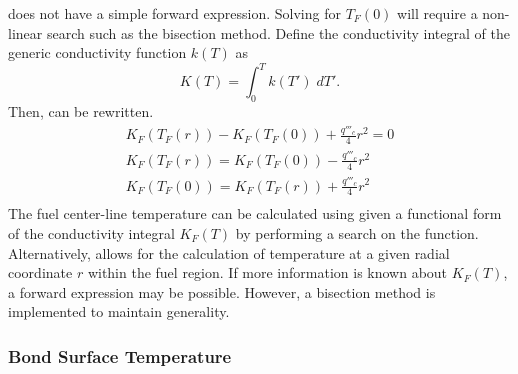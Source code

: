      does not have a simple forward expression. Solving
    for $T_F(0)$ will require a non-linear search such as the bisection method.
    Define the conductivity integral of the generic conductivity function
    $k(T)$ as
    \begin{equation}
      \label{eq:conductivity_integral}
      K(T) = \int_0^T k(T') \; dT'.
    \end{equation}
    Then,  can be rewritten.
    \begin{gather}
      K_F(T_F(r)) - K_F(T_F(0)) + \frac{q'''_c}{4} r^2 = 0 \\
      \label{eq:tfr_conductivity_integral}
      K_F(T_F(r)) = K_F(T_F(0)) - \frac{q'''_c}{4} r^2  \\ 
      \label{eq:tcl_conductivity_integral}
      K_F(T_F(0)) = K_F(T_F(r)) + \frac{q'''_c}{4} r^2 \\
    \end{gather}
    The fuel center-line temperature can be calculated using
     given a functional form of the
    conductivity integral $K_F(T)$ by performing a search on the function.
    Alternatively,  allows for the
    calculation of temperature at a given radial coordinate $r$ within the fuel
    region. If more information is known about $K_F(T)$, a forward expression
    may be possible. However, a bisection method is implemented to maintain
    generality.

    \subsubsection{Bond Surface Temperature}
